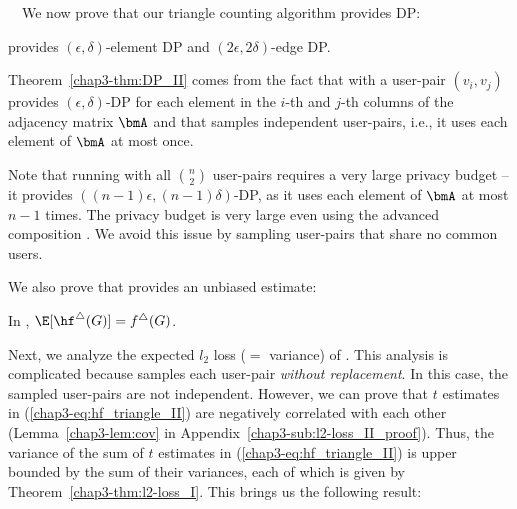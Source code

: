 \smallskip
{}~~We now prove that our triangle counting algorithm \AlgWSTri{} provides DP: 
\begin{theorem}
\label{chap3-thm:DP_II}
\AlgWSTri{} provides $(\epsilon, \delta)$-element DP and $(2\epsilon, 2\delta)$-edge DP. 
\end{theorem}
Theorem~\ref{chap3-thm:DP_II} comes from the fact that 
\AlgWS{} with a user-pair $(v_i,v_j)$ provides $(\epsilon,\delta)$-DP for each element in the $i$-th and $j$-th columns of the adjacency matrix $\bmA$ and that \AlgWSTri{} samples independent user-pairs, i.e., it uses each element of $\bmA$ at most once. 

Note that running \AlgWS{} with all $\binom{n}{2}$ user-pairs requires a very large privacy budget --  
it provides $((n-1) \epsilon, (n-1) \delta)$-DP, as it uses each element of $\bmA$ at most $n-1$ times. 
The privacy budget is very large even using the advanced composition \cite{DP,Kairouz_ICML15}. 
We avoid this issue by sampling user-pairs that share no common users. 

We also prove that 
\AlgWSTri{} provides an unbiased estimate: 
\begin{theorem}
\label{chap3-thm:unbiased_II}
In \AlgWSTri{}, $\E[\hf^\triangle(G)] = f^\triangle(G)$. 
\end{theorem}

Next, we analyze the expected $l_2$ loss ($=$ variance) of \AlgWSTri{}. 
This analysis is complicated because \AlgWSTri{} samples each user-pair \textit{without replacement}. 
In this case, the sampled user-pairs are not independent. 
However, we can prove that 
$t$ estimates in (\ref{chap3-eq:hf_triangle_II}) are negatively correlated with each other (Lemma~\ref{chap3-lem:cov} in Appendix~\ref{chap3-sub:l2-loss_II_proof}). 
Thus, the variance of the sum of $t$ estimates 
in (\ref{chap3-eq:hf_triangle_II}) is upper bounded by the sum of their variances, each of which is given by Theorem~\ref{chap3-thm:l2-loss_I}. 
This brings us the following result: 

